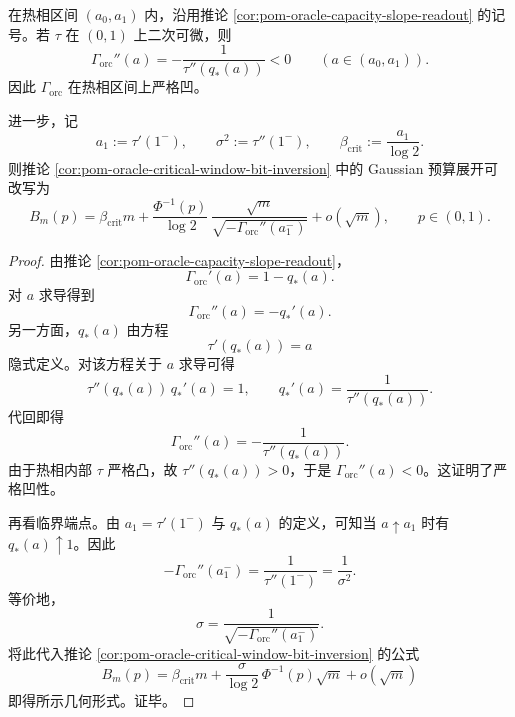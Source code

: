 \begin{theorem}\label{thm:pom-oracle-frontier-curvature-gaussian-window}
在热相区间 \((a_0,a_1)\) 内，沿用推论 \ref{cor:pom-oracle-capacity-slope-readout} 的记号。若 \(\tau\) 在 \((0,1)\) 上二次可微，则
\[
\boxed{\;
\Gamma_{\mathrm{orc}}''(a)
=
-\frac{1}{\tau''(q_*(a))}<0
\qquad (a\in(a_0,a_1)).\;}
\]
因此 \(\Gamma_{\mathrm{orc}}\) 在热相区间上严格凹。

进一步，记
\[
a_1:=\tau'(1^-),\qquad
\sigma^2:=\tau''(1^-),\qquad
\beta_{\mathrm{crit}}:=\frac{a_1}{\log 2}.
\]
则推论 \ref{cor:pom-oracle-critical-window-bit-inversion} 中的 Gaussian 预算展开可改写为
\[
\boxed{\;
B_m(p)
=
\beta_{\mathrm{crit}}m
+
\frac{\Phi^{-1}(p)}{\log 2}\,
\frac{\sqrt m}{\sqrt{-\Gamma_{\mathrm{orc}}''(a_1^-)}}
+o(\sqrt m),\qquad p\in(0,1).\;}
\]
\end{theorem}
\begin{proof}
由推论 \ref{cor:pom-oracle-capacity-slope-readout}，
\[
\Gamma_{\mathrm{orc}}'(a)=1-q_*(a).
\]
对 \(a\) 求导得到
\[
\Gamma_{\mathrm{orc}}''(a)=-q_*'(a).
\]
另一方面，\(q_*(a)\) 由方程
\[
\tau'(q_*(a))=a
\]
隐式定义。对该方程关于 \(a\) 求导可得
\[
\tau''(q_*(a))\,q_*'(a)=1,
\qquad
q_*'(a)=\frac{1}{\tau''(q_*(a))}.
\]
代回即得
\[
\Gamma_{\mathrm{orc}}''(a)
=
-\frac{1}{\tau''(q_*(a))}.
\]
由于热相内部 \(\tau\) 严格凸，故 \(\tau''(q_*(a))>0\)，于是 \(\Gamma_{\mathrm{orc}}''(a)<0\)。这证明了严格凹性。

再看临界端点。由 \(a_1=\tau'(1^-)\) 与 \(q_*(a)\) 的定义，可知当 \(a\uparrow a_1\) 时有 \(q_*(a)\uparrow 1\)。因此
\[
-\Gamma_{\mathrm{orc}}''(a_1^-)
=
\frac{1}{\tau''(1^-)}
=
\frac{1}{\sigma^2}.
\]
等价地，
\[
\sigma=\frac{1}{\sqrt{-\Gamma_{\mathrm{orc}}''(a_1^-)}}.
\]
将此代入推论 \ref{cor:pom-oracle-critical-window-bit-inversion} 的公式
\[
B_m(p)=\beta_{\mathrm{crit}}m+\frac{\sigma}{\log 2}\,\Phi^{-1}(p)\sqrt m+o(\sqrt m)
\]
即得所示几何形式。证毕。
\end{proof}

\endinput
